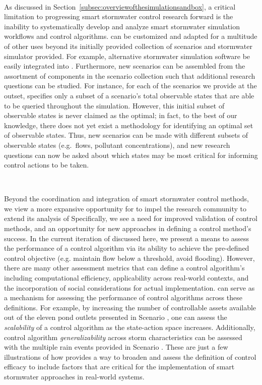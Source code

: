 \

As discussed in Section~\ref{subsec:overviewofthesimulationsandbox}, a critical limitation to progressing smart stormwater control research forward is the inability to systematically develop and analyze smart stormwater simulation workflows and control algorithms. \pystorms can be customized and adapted for a multitude of other uses beyond its initially provided collection of scenarios and stormwater simulator provided. For example, alternative stormwater simulation software be easily integrated into \pystormsNOSPACE.  Furthermore, new scenarios can be assembled from the assortment of components in the scenario collection such that additional research questions can be studied. For instance, for each of the scenarios we provide at the outset, \pystorms specifies only a subset of a scenario's total observable states that are able to be queried throughout the simulation.
However, this initial subset of observable states is never claimed as the optimal; in fact, to the best of our knowledge, there does not yet exist a methodology for identifying an optimal set of observable states. Thus, new scenarios can be made with different subsets of observable states (e.g.\ flows, pollutant concentrations), and new research questions can now be asked about which states may be most critical for informing control actions to be taken.

\

Beyond the coordination and integration of smart stormwater control methods, we view a more expansive opportunity for \pystorms to impel the research community to extend its analysis of  Specifically, we see a need for improved validation of control methods, and an opportunity for new approaches in defining a control method's success. In the current iteration of \pystorms discussed here, we present a means to assess the performance of a control algorithm via its ability to achieve the pre-defined control objective (e.g. maintain flow below a threshold, avoid flooding). However, there are many other assessment metrics that can define a control algorithm's  including computational efficiency, applicability across real-world contexts, and the incorporation of social considerations for actual implementation.
\pystorms can serve as a mechanism for assessing the performance of control algorithms across these definitions. For example, by increasing the number of controllable assets available out of the eleven pond outlets presented in Scenario , one can assess the \emph{scalability} of a control algorithm as the state-action space increases. Additionally, control algorithm \emph{generalizability} across storm characteristics can be assessed with the multiple rain events provided in Scenario . These are just a few illustrations of how \pystorms provides a way to broaden and assess the definition of control efficacy to include factors that are critical for the implementation of smart stormwater approaches in real-world systems.
%
%
%
%
%
%
%
%
%
%
%
%
%
%
%
